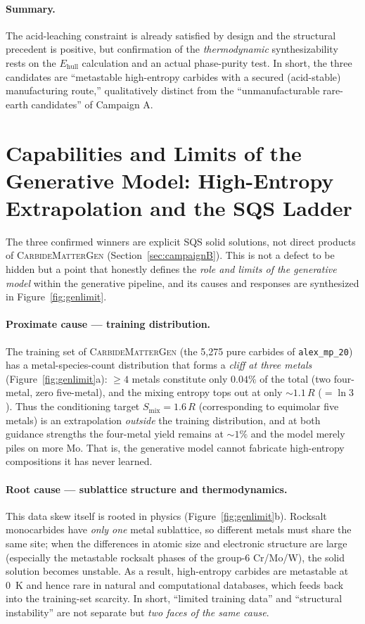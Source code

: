 \documentclass[11pt,a4paper]{report}
\begin{document}
\paragraph{Summary.} The acid-leaching constraint is already satisfied by design and the structural precedent is
positive, but confirmation of the \emph{thermodynamic} synthesizability rests on the $E_{\mathrm{hull}}$
calculation and an actual phase-purity test. In short, the three candidates are ``metastable high-entropy
carbides with a secured (acid-stable) manufacturing route,'' qualitatively distinct from the ``unmanufacturable
rare-earth candidates'' of Campaign A.

\section{Capabilities and Limits of the Generative Model: High-Entropy Extrapolation and the SQS Ladder}
\label{sec:gen-limit}
The three confirmed winners are explicit SQS solid solutions, not direct products of \textsc{CarbideMatterGen}
(Section~\ref{sec:campaignB}). This is not a defect to be hidden but a point that honestly defines the
\emph{role and limits of the generative model} within the generative pipeline, and its causes and responses are
synthesized in Figure~\ref{fig:genlimit}.

\paragraph{Proximate cause --- training distribution.} The training set of \textsc{CarbideMatterGen} (the 5{,}275
pure carbides of \texttt{alex\_mp\_20}) has a metal-species-count distribution that forms a \emph{cliff at three
metals} (Figure~\ref{fig:genlimit}a): $\ge\!4$ metals constitute only $0.04\%$ of the total (two four-metal, zero
five-metal), and the mixing entropy tops out at only $\sim\!1.1\,R$ ($=\ln 3$). Thus the conditioning target
$S_{\mathrm{mix}}=1.6\,R$ (corresponding to equimolar five metals) is an extrapolation \emph{outside} the training
distribution, and at both guidance strengths the four-metal yield remains at $\sim\!1\%$ and the model merely
piles on more Mo. That is, the generative model cannot fabricate high-entropy compositions it has never learned.

\paragraph{Root cause --- sublattice structure and thermodynamics.} This data skew itself is rooted in physics
(Figure~\ref{fig:genlimit}b). Rocksalt monocarbides have \emph{only one} metal sublattice, so different metals
must share the same site; when the differences in atomic size and electronic structure are large (especially the
metastable rocksalt phases of the group-6 Cr/Mo/W), the solid solution becomes unstable. As a result, high-entropy
carbides are metastable at 0~K and hence rare in natural and computational databases, which feeds back into the
training-set scarcity. In short, ``limited training data'' and ``structural instability'' are not separate but
\emph{two faces of the same cause}.
\end{document}
